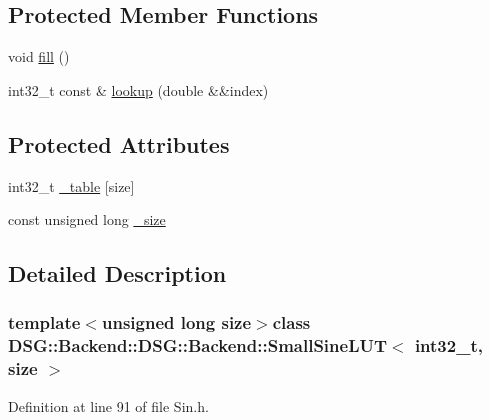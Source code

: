 \subsection*{Protected Member Functions}
\begin{DoxyCompactItemize}
\item 
void \hyperlink{classDSG_1_1Backend_1_1DSG_1_1Backend_1_1SmallSineLUT_3_01int32__t_00_01size_01_4_a05c97d82f124088ad802ce5db5b6290b}{fill} ()
\item 
int32\+\_\+t const \& \hyperlink{classDSG_1_1Backend_1_1DSG_1_1Backend_1_1SmallSineLUT_3_01int32__t_00_01size_01_4_adc63dbfd6169d226255d6bc5c61d4c00}{lookup} (double \&\&index)
\end{DoxyCompactItemize}
\subsection*{Protected Attributes}
\begin{DoxyCompactItemize}
\item 
int32\+\_\+t \hyperlink{classDSG_1_1Backend_1_1DSG_1_1Backend_1_1LUT_a427da4b7eccdfe25e3c1889a8c2fdea6}{\+\_\+table} \mbox{[}size\mbox{]}
\item 
const unsigned long \hyperlink{classDSG_1_1Backend_1_1DSG_1_1Backend_1_1LUT_aa48956aa4debf08fdb517cb751d3e01d}{\+\_\+size}
\end{DoxyCompactItemize}


\subsection{Detailed Description}
\subsubsection*{template$<$unsigned long size$>$class D\+S\+G\+::\+Backend\+::\+D\+S\+G\+::\+Backend\+::\+Small\+Sine\+L\+U\+T$<$ int32\+\_\+t, size $>$}



Definition at line 91 of file Sin.\+h.



